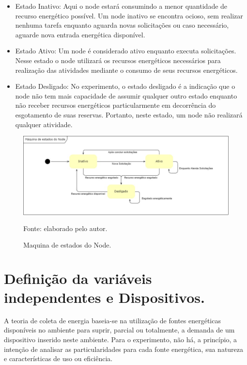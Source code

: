 \begin{itemize}
	\item Estado Inativo: Aqui o node estará consumindo a menor quantidade de recurso energético possível. Um node inativo se encontra ocioso, sem realizar nenhuma tarefa enquanto aguarda novas solicitações ou caso necessário, aguarde nova entrada energética disponível.
	\item Estado Ativo: Um node é considerado ativo enquanto executa solicitações. Nesse estado o node utilizará os recursos energéticos necessários para realização das atividades mediante o consumo de seus recursos energéticos. 
	\item Estado Desligado: No experimento, o estado desligado é a indicação que o node não tem mais capacidade de assumir qualquer outro estado enquanto não receber recursos energéticos particularmente em decorrência do esgotamento de suas reservas. Portanto, neste estado, um node não realizará qualquer atividade.	
	
\end{itemize}




\begin{figure}[H]
	\centering
	
	\caption{Maquina de estados do Node.}
	\label{fig:cap6maquinaestados}
	\noindent\includegraphics[width=0.75\linewidth]{Imagens/cap6/cap6maquinaestados.jpg} 
	
	Fonte: elaborado pelo autor.
\end{figure}


\section{Definição da variáveis independentes e Dispositivos.}

A teoria de coleta de energia baseia-se na utilização de fontes energéticas disponíveis no ambiente para suprir, parcial ou totalmente, a demanda de um dispositivo inserido neste ambiente. Para o experimento, não há, a princípio, a intenção de analisar as particularidades para cada fonte energética, sua natureza e características de uso ou eficiência. 

